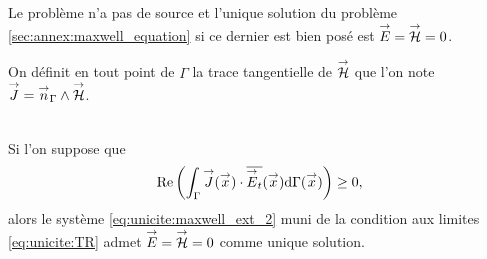   Le problème n'a pas de source et l'unique solution du problème \eqref{sec:annex:maxwell_equation} si ce dernier est bien posé est \({\overset{\rightarrow}{E}}={\overset{\rightarrow}{\mathcal{H}}}=0\).

  On définit en tout point de \(\Gamma\) la trace tangentielle de \({\overset{\rightarrow}{\mathcal{H}}}\) que l'on note \({\overset{\rightarrow}{J}} = {\overset{\rightarrow}{n}}_\Gamma \wedge {\overset{\rightarrow}{\mathcal{H}}}\).
  \begin{prop}~\\
    Si l'on suppose que
    \begin{equation}
      \label{eq:unicite:form_var:cgu}
      \Re\left(\int_\Gamma \vJ(\vx) \cdot \conj{\vE_t}(\vx) \dd{\Gamma(\vx)}\right) \ge 0,
    \end{equation}
    alors le système \eqref{eq:unicite:maxwell_ext_2} muni de la condition aux limites \eqref{eq:unicite:TR} admet \({\overset{\rightarrow}{E}}={\overset{\rightarrow}{\mathcal{H}}}=0\) comme unique solution.
  \end{prop}

